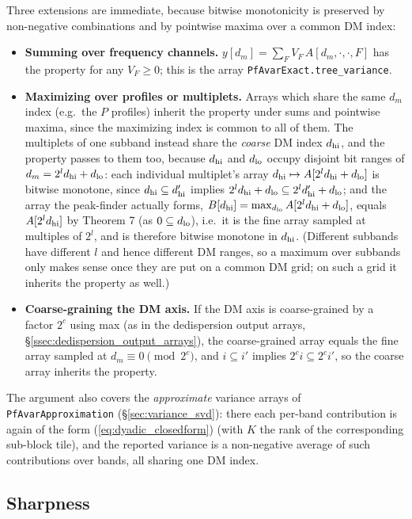 \documentclass{article}
\numberwithin{equation}{section}   %
\begin{document}
\medskip
\par\noindent
Three extensions are immediate, because bitwise monotonicity is preserved by non-negative
combinations and by pointwise maxima over a common DM index:
\begin{itemize}
\item {\bf Summing over frequency channels.} $y[d_m] = \sum_F V_F \, A[d_m,\cdot,\cdot,F]$
has the property for any $V_F \ge 0$; this is the array {\tt PfAvarExact.tree\_variance}.
\item {\bf Maximizing over profiles or multiplets.} Arrays which share the same $d_m$ index
(e.g.\ the $P$ profiles) inherit the property under sums and pointwise maxima, since the
maximizing index is common to all of them. The multiplets of one subband instead share the
{\em coarse} DM index $d_{\rm hi}$, and the property passes to them too, because $d_{\rm hi}$
and $d_{\rm lo}$ occupy disjoint bit ranges of $d_m = 2^l d_{\rm hi} + d_{\rm lo}$: each
individual multiplet's array $d_{\rm hi} \mapsto A[2^l d_{\rm hi} + d_{\rm lo}]$ is bitwise
monotone, since $d_{\rm hi} \subseteq d'_{\rm hi}$ implies
$2^l d_{\rm hi} + d_{\rm lo} \subseteq 2^l d'_{\rm hi} + d_{\rm lo}$; and the array the
peak-finder actually forms,
$B[d_{\rm hi}] = \max_{d_{\rm lo}} A[2^l d_{\rm hi} + d_{\rm lo}]$, equals
$A[2^l d_{\rm hi}]$ by Theorem 7 (as $0 \subseteq d_{\rm lo}$), i.e.\ it is the fine array
sampled at multiples of $2^l$, and is therefore bitwise monotone in $d_{\rm hi}$. (Different
subbands have different $l$ and hence different DM ranges, so a maximum over subbands only
makes sense once they are put on a common DM grid; on such a grid it inherits the property
as well.)
\item {\bf Coarse-graining the DM axis.} If the DM axis is coarse-grained by a factor $2^c$
using max (as in the dedispersion output arrays, \S\ref{ssec:dedispersion_output_arrays}),
the coarse-grained array equals the fine array sampled at $d_m \equiv 0 \pmod {2^c}$, and
$i \subseteq i'$ implies $2^c i \subseteq 2^c i'$, so the coarse array inherits the property.
\end{itemize}
The argument also covers the {\em approximate} variance arrays of {\tt PfAvarApproximation}
(\S\ref{sec:variance_svd}): there each per-band contribution is again of the form
(\ref{eq:dyadic_closedform}) (with $K$ the rank of the corresponding sub-block tile), and the
reported variance is a non-negative average of such contributions over bands, all sharing one
DM index.

\subsection{Sharpness}
\label{ssec:dyadic_sharpness}
\end{document}
